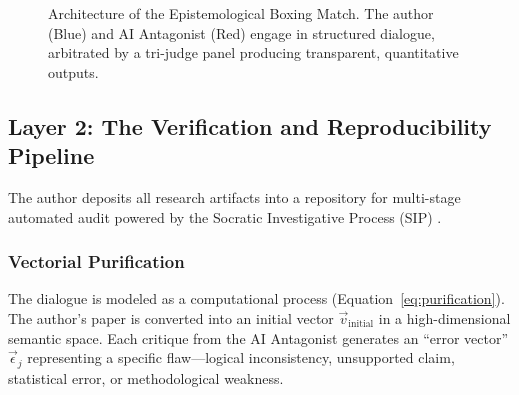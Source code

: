 \documentclass[11pt,a4paper]{article}
\begin{document}
\begin{small}
\begin{figure}[h!]
\centering
{}
\caption{Architecture of the Epistemological Boxing Match. The author (Blue) and AI Antagonist (Red) engage in structured dialogue, arbitrated by a tri-judge panel producing transparent, quantitative outputs.}
\label{fig:boxing}
\end{figure}

\subsection{Layer 2: The Verification and Reproducibility Pipeline}
The author deposits all research artifacts into a repository for multi-stage automated audit powered by the Socratic Investigative Process (SIP) \citep{Kovnatsky2025SIP}.

\subsubsection{Vectorial Purification}
The dialogue is modeled as a computational process (Equation~\eqref{eq:purification}). The author's paper is converted into an initial vector $\vec{v}_{\text{initial}}$ in a high-dimensional semantic space. Each critique from the AI Antagonist generates an ``error vector'' $\vec{\epsilon}_j$ representing a specific flaw—logical inconsistency, unsupported claim, statistical error, or methodological weakness.


\end{small}
\end{document}
